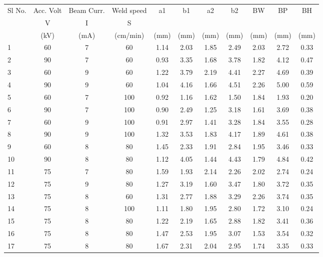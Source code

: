 \begin{landscape}
 \\ \\


\begin{table}[h]
\begin{center} 
\vspace{-20 pt}
\begin{tabular}{l c c c c c c c c c c}
\hline
{Sl No.}&{Acc. Volt}&{Beam Curr.}&{Weld speed}&{a1}&{b1}&{a2}&{b2}&{BW}&{BP}&{BH}\\
{}&{V}&{I}&{S}&{}&{}&{}&{}&{}&{}&{}\\
{}&{(kV)}&{(mA)}&{(cm/min)}&{(mm)}&{(mm)}&{(mm)}&{(mm)}&{(mm)}&{(mm)}&{(mm)}\\\hline
{1}&{60}&	{7}&	{60}&	{1.14}&	{2.03}&	{1.85}&	{2.49}&	{2.03}&	{2.72}&	{0.33}\\
{2}&{90}&	{7}&	{60}&	{0.93}&	{3.35}&	{1.68}&	{3.78}&	{1.82}&	{4.12}&	{0.47}\\
{3}&{60}&	{9}&	{60}&	{1.22}&	{3.79}&	{2.19}&	{4.41}&	{2.27}&	{4.69}&	{0.39}\\
{4}&{90}&	{9}&	{60}&	{1.04}&	{4.16}&	{1.66}&	{4.51}&	{2.26}&	{5.00}&	{0.59}\\
{5}&{60}&	{7}&	{100}&	{0.92}&	{1.16}&	{1.62}&	{1.50}&	{1.84}&	{1.93}&	{0.20}\\
{6}&{90}&	{7}&	{100}&	{0.90}&	{2.49}&	{1.25}&	{3.18}&	{1.61}&	{3.69}&	{0.38}\\
{7}&{60}&	{9}&	{100}&	{0.91}&	{2.97}&	{1.41}&	{3.28}&	{1.84}&	{3.55}&	{0.28}\\
{8}&{90}&	{9}&	{100}&	{1.32}&	{3.53}&	{1.83}&	{4.17}&	{1.89}&	{4.61}&	{0.38}\\
{9}&{60}&	{8}&	{80}&	{1.45}&	{2.33}&	{1.91}&	{2.84}&	{1.95}&	{3.46}&	{0.33}\\
{10}&{90}&	{8}&	{80}&	{1.12}&	{4.05}&	{1.44}&	{4.43}&	{1.79}&	{4.84}&	{0.42}\\
{11}&{75}&	{7}&	{80}&	{1.59}&	{1.93}&	{2.14}&	{2.26}&	{2.02}&	{2.74}&	{0.24}\\
{12}&{75}&	{9}&	{80}&	{1.27}&	{3.19}&	{1.60}&	{3.47}&	{1.80}&	{3.72}&	{0.35}\\
{13}&{75}&	{8}&	{60}&	{1.31}&	{2.77}&	{1.88}&	{3.29}&	{2.26}&	{3.74}&	{0.35}\\
{14}&{75}&	{8}&	{100}&	{1.11}&	{1.80}&	{1.95}&	{2.80}&	{1.72}&	{3.10}&	{0.24}\\
{15}&{75}&	{8}&	{80}&	{1.22}&	{2.19}&	{1.65}&	{2.88}&	{1.82}&	{3.41}&	{0.36}\\
{16}&{75}&	{8}&	{80}&	{1.47}&	{2.53}&	{1.95}&	{3.07}&	{1.53}&	{3.54}&	{0.32}\\
{17}&{75}&	{8}&	{80}&	{1.67}&	{2.31}&	{2.04}&	{2.95}&	{1.74}&	{3.35}&	{0.33}\\

\end{tabular}
\end{center}
\end{table}
\end{landscape}
\pagebreak
\newpage
\clearpage

